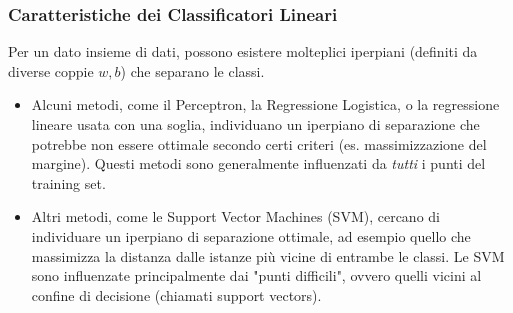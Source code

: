 \documentclass{article}
\begin{document}
\subsubsection{Caratteristiche dei Classificatori Lineari}
Per un dato insieme di dati, possono esistere molteplici iperpiani (definiti da diverse coppie $w, b$) che separano le classi.
\begin{itemize}
    \item Alcuni metodi, come il Perceptron, la Regressione Logistica, o la regressione lineare usata con una soglia, individuano un iperpiano di separazione che potrebbe non essere ottimale secondo certi criteri (es. massimizzazione del margine).  Questi metodi sono generalmente influenzati da \textit{tutti} i punti del training set.
    \item Altri metodi, come le Support Vector Machines (SVM), cercano di individuare un iperpiano di separazione ottimale, ad esempio quello che massimizza la distanza dalle istanze più vicine di entrambe le classi. Le SVM sono influenzate principalmente dai "punti difficili", ovvero quelli vicini al confine di decisione (chiamati support vectors).
\end{itemize}
\end{document}
